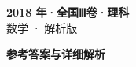 \documentclass[zihao=-4, a4paper]{ctexart}
\begin{document}
\begin{center}
  {\Large\bfseries 2018 年·全国Ⅲ卷·理科}\\[4pt]
  {\large 数学 · 解析版}
\end{center}
\medskip
{}

\clearpage
{}
\begin{center}{\Large\bfseries 参考答案与详细解析}\end{center}
\medskip

\end{document}
